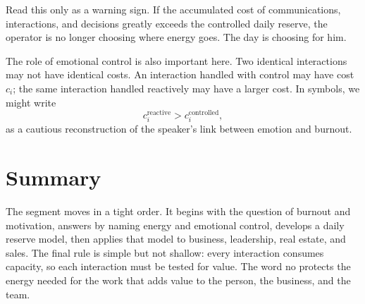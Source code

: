 Read this only as a warning sign. If the accumulated cost of communications, interactions, and decisions greatly exceeds the controlled daily reserve, the operator is no longer choosing where energy goes. The day is choosing for him.

The role of emotional control is also important here. Two identical interactions may not have identical costs. An interaction handled with control may have cost \(c_i\); the same interaction handled reactively may have a larger cost. In symbols, we might write
\begin{equation}
c_i^{\mathrm{reactive}} > c_i^{\mathrm{controlled}},
\end{equation}
as a cautious reconstruction of the speaker's link between emotion and burnout.

\section{Summary}

The segment moves in a tight order. It begins with the question of burnout and motivation, answers by naming energy and emotional control, develops a daily reserve model, then applies that model to business, leadership, real estate, and sales. The final rule is simple but not shallow: every interaction consumes capacity, so each interaction must be tested for value. The word no protects the energy needed for the work that adds value to the person, the business, and the team.